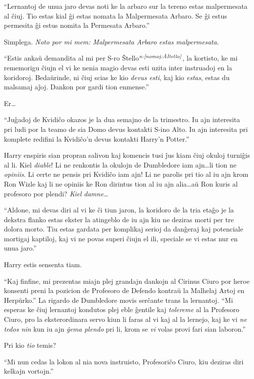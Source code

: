 ``Lernantoj de unua jaro devas noti ke la arbaro sur la tereno estas
malpermesata al ĉiuj. Tio estas kial ĝi estas nomata la Malpermesata
Arbaro. Se ĝi estus permesita ĝi estus nomita la Permesata Arbaro.''

Simplega. \emph{Noto por mi mem: Malpermesata Arbaro estas
  malpermesata.}

``Estis ankaŭ demandita al mi per S-ro Ŝtello$^{\textit{n:\ref{nomoj:ŝtello}}}$,
la kortisto, ke mi rememorigu ĉiujn el vi ke nenia magio devas esti
uzita inter instruadoj en la koridoroj. Bedaŭrinde, ni ĉiuj scias ke
kio \emph{devus esti}, kaj kio \emph{estas}, estas du malsamaj
aĵoj. Dankon por gardi tion enmense.''

Er\ldots

``Juĝadoj de Kvidiĉo okazos je la dua semajno de la trimestro. Iu ajn
interesita pri ludi por la teamo de sia Domo devus kontakti S-ino
Alto. Iu ajn interesita pri komplete redifini
la Kvidiĉo'n devus kontakti Harry'n Potter.''

Harry enspiris sian propran salivon kaj komencis tusi ĵus kiam ĉiuj
okuloj turniĝis al li. Kiel \emph{diable}! Li ne renkontis la okulojn
de Dumbledore iam ajn\ldots li tion ne \emph{opiniis}. Li certe ne
pensis pri Kvidiĉo iam ajn! Li ne parolis pri tio al iu ajn krom Ron
Wizle kaj li ne opiniis ke Ron dirintus tion al iu ajn alia\ldots aŭ
Ron kuris al profesoro por plendi? \emph{Kiel damne\ldots}

``Aldone, mi devas diri al vi ke ĉi tiun jaron, la koridoro de la tria
etaĝo je la dekstra flanko estas ekster la atingeblo de iu ajn kiu ne
deziras morti per tre dolora morto. Tiu estas gardata per komplikaj
serioj da danĝeraj kaj potenciale mortigaj kaptiloj, kaj vi ne povas
superi ĉiujn el ili, speciale se vi estas nur en unua jaro.''

Harry estis sensenta tiam.

``Kaj finfine, mi prezentas miajn plej grandajn dankojn al Cirinus
Ciuro por heroe konsenti preni la pozicion de Profesoro de Defendo
kontraŭ la Malhelaj Artoj en Herpŭrko.'' La rigardo de Dumbledore
movis serĉante trans la lernantoj. ``Mi esperas ke ĉiuj lernantoj
kondutos plej eble ĝentile kaj \emph{tolereme} al la Profesoro Ciuro,
pro la eksterordinara servo kiun li faras al vi kaj al la lernejo, kaj
ke vi \emph{ne tedos nin} kun iu ajn \emph{ĝema plendo} pri li, krom
se \emph{vi} volas provi fari sian laboron.''

Pri kio \emph{tio} temis?

``Mi nun cedas la lokon al nia nova instruisto, Profesoriĉo Ciuro, kiu
deziras diri kelkajn vortojn.''

